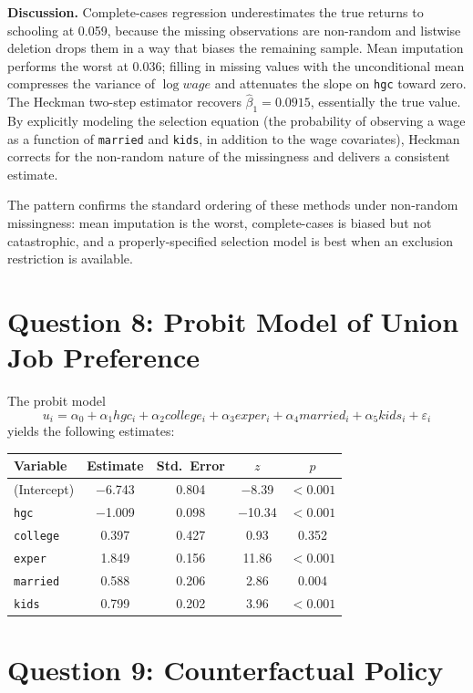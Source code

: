 \documentclass[12pt,english]{article}
\begin{document}
\textbf{Discussion.} Complete-cases regression underestimates the true
returns to schooling at 0.059, because the missing observations are
non-random and listwise deletion drops them in a way that biases the
remaining sample. Mean imputation performs the worst at 0.036; filling
in missing values with the unconditional mean compresses the variance
of $\log wage$ and attenuates the slope on \texttt{hgc} toward zero.
The Heckman two-step estimator recovers $\hat{\beta}_1 = 0.0915$,
essentially the true value. By explicitly modeling the selection
equation (the probability of observing a wage as a function of
\texttt{married} and \texttt{kids}, in addition to the wage covariates),
Heckman corrects for the non-random nature of the missingness and
delivers a consistent estimate.

The pattern confirms the standard ordering of these methods under
non-random missingness: mean imputation is the worst, complete-cases
is biased but not catastrophic, and a properly-specified selection
model is best when an exclusion restriction is available.

\section*{Question 8: Probit Model of Union Job Preference}

The probit model
$$ u_i = \alpha_0 + \alpha_1 hgc_i + \alpha_2 college_i + \alpha_3 exper_i
       + \alpha_4 married_i + \alpha_5 kids_i + \varepsilon_i $$
yields the following estimates:

\begin{center}
\begin{tabular}{lcccc}
\toprule
Variable & Estimate & Std.\ Error & $z$ & $p$ \\
\midrule
(Intercept) & $-$6.743 & 0.804 & $-$8.39 & $<0.001$ \\
\texttt{hgc}     & $-$1.009 & 0.098 & $-$10.34 & $<0.001$ \\
\texttt{college} &    0.397 & 0.427 &    0.93 & 0.352 \\
\texttt{exper}   &    1.849 & 0.156 &   11.86 & $<0.001$ \\
\texttt{married} &    0.588 & 0.206 &    2.86 & 0.004 \\
\texttt{kids}    &    0.799 & 0.202 &    3.96 & $<0.001$ \\
\bottomrule
\end{tabular}
\end{center}

\section*{Question 9: Counterfactual Policy}
\end{document}
